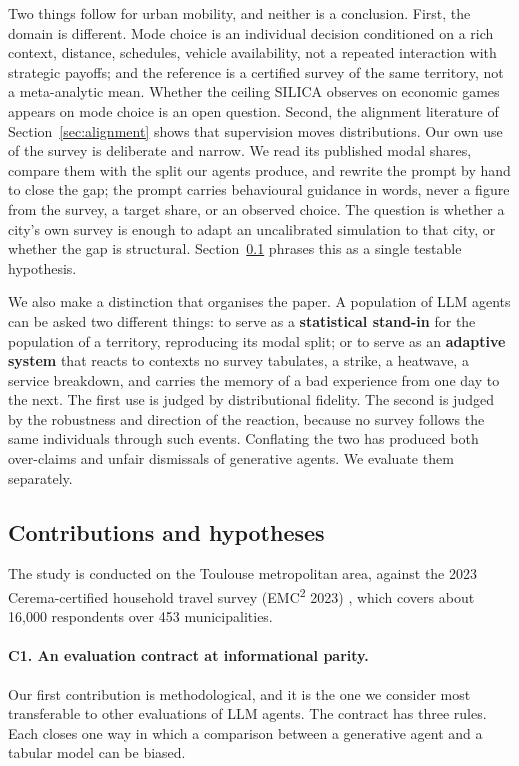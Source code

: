 Two things follow for urban mobility, and neither is a conclusion. First, the domain is different. Mode choice is an individual decision conditioned on a rich context, distance, schedules, vehicle availability, not a repeated interaction with strategic payoffs; and the reference is a certified survey of the same territory, not a meta-analytic mean. Whether the ceiling SILICA observes on economic games appears on mode choice is an open question. Second, the alignment literature of Section~\ref{sec:alignment} shows that supervision moves distributions. Our own use of the survey is deliberate and narrow. We read its published modal shares, compare them with the split our agents produce, and rewrite the prompt by hand to close the gap; the prompt carries behavioural guidance in words, never a figure from the survey, a target share, or an observed choice. The question is whether a city's own survey is enough to adapt an uncalibrated simulation to that city, or whether the gap is structural. Section~\ref{sec:contributions} phrases this as a single testable hypothesis.

We also make a distinction that organises the paper. A population of LLM agents can be asked two different things: to serve as a \textbf{statistical stand-in} for the population of a territory, reproducing its modal split; or to serve as an \textbf{adaptive system} that reacts to contexts no survey tabulates, a strike, a heatwave, a service breakdown, and carries the memory of a bad experience from one day to the next. The first use is judged by distributional fidelity. The second is judged by the robustness and direction of the reaction, because no survey follows the same individuals through such events. Conflating the two has produced both over-claims and unfair dismissals of generative agents. We evaluate them separately.

\subsection{Contributions and hypotheses}
\label{sec:contributions}

The study is conducted on the Toulouse metropolitan area, against the 2023 Cerema-certified household travel survey (EMC\textsuperscript{2} 2023) \citep{tisseo2023emc2}, which covers about 16,000 respondents over 453 municipalities. %

\paragraph{C1. An evaluation contract at informational parity.}
Our first contribution is methodological, and it is the one we consider most transferable to other evaluations of LLM agents. The contract has three rules. Each closes one way in which a comparison between a generative agent and a tabular model can be biased.

